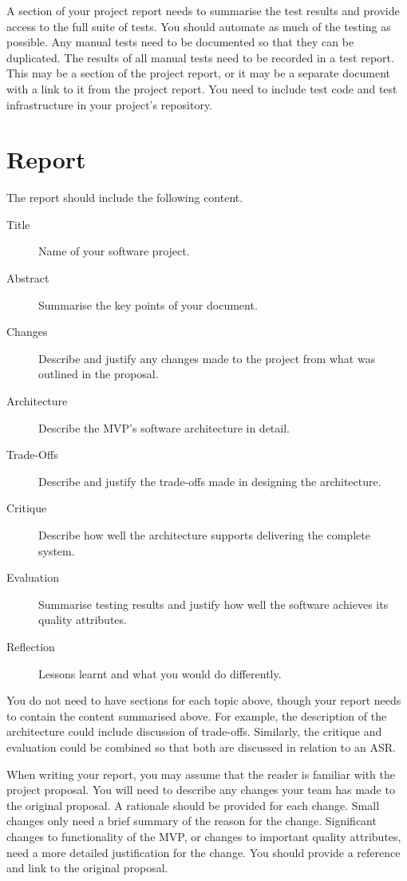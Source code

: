 \documentclass{csse4400}
\begin{document}
A section of your project report needs to summarise the test results and provide access to the full suite of tests.
You should automate as much of the testing as possible.
Any manual tests need to be documented so that they can be duplicated.
The results of all manual tests need to be recorded in a test report.
This may be a section of the project report, or it may be a separate document with a link to it from the project report.
You need to include test code and test infrastructure in your project's repository.


\section{Report}
The report should include the following content.

\begin{description}
    \item[Title] Name of your software project.
    \item[Abstract] Summarise the key points of your document.
    \item[Changes] Describe and justify any changes made to the project from what was outlined in the proposal.
    \item[Architecture] Describe the MVP's software architecture in detail.
    \item[Trade-Offs] Describe and justify the trade-offs made in designing the architecture.
    \item[Critique] Describe how well the architecture supports delivering the complete system.
    \item[Evaluation] Summarise testing results and justify how well the software achieves its quality attributes.
    \item[Reflection] Lessons learnt and what you would do differently.
\end{description}

You do not need to have sections for each topic above, though your report needs to contain the content summarised above.
For example, the description of the architecture could include discussion of trade-offs.
Similarly, the critique and evaluation could be combined so that both are discussed in relation to an ASR.

When writing your report, you may assume that the reader is familiar with the project proposal.
You will need to describe any changes your team has made to the original proposal.
A rationale should be provided for each change.
Small changes only need a brief summary of the reason for the change.
Significant changes to functionality of the MVP, or changes to important quality attributes,
need a more detailed justification for the change.
You should provide a reference and link to the original proposal.
\end{document}
